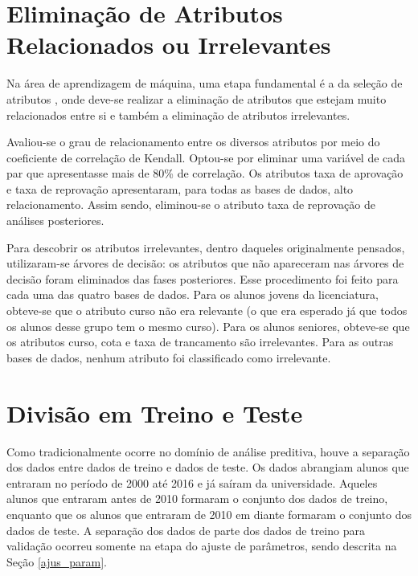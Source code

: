 \section{Eliminação de Atributos Relacionados ou Irrelevantes}
\par Na área de aprendizagem de máquina, uma etapa fundamental é a da seleção de
atributos \cite{useful_ml}, onde deve-se realizar a
eliminação de atributos que estejam muito relacionados entre si e também a eliminação
de atributos irrelevantes. 
 
\par Avaliou-se o grau de relacionamento entre os diversos atributos por meio do
coeficiente de correlação de Kendall. Optou-se por eliminar uma variável de cada par
que apresentasse mais de 80\% de correlação. Os atributos taxa de aprovação e taxa de
reprovação apresentaram, para todas as bases de dados, alto relacionamento. Assim
sendo, eliminou-se o atributo taxa de reprovação de análises posteriores. 

\par Para descobrir os atributos irrelevantes, dentro daqueles originalmente
pensados, utilizaram-se árvores de decisão: os atributos que não apareceram nas
árvores de decisão foram eliminados das fases posteriores. Esse procedimento foi
feito para cada uma das quatro bases de dados. Para os alunos jovens da licenciatura,
obteve-se que o atributo curso não era relevante (o que era esperado já que todos os alunos
desse grupo tem o mesmo curso). Para os alunos seniores, obteve-se que os atributos
curso, cota e taxa de trancamento são irrelevantes. Para as outras bases de dados, nenhum
atributo foi classificado como irrelevante. 

\section{Divisão em Treino e Teste}
Como tradicionalmente ocorre no domínio de análise preditiva, houve a separação dos
dados entre dados de treino e dados de teste. Os dados abrangiam alunos que entraram
no período de 2000 até 2016 e já saíram da universidade. Aqueles alunos que entraram
antes de 2010 formaram o conjunto dos dados de treino, enquanto que os alunos que
entraram de 2010 em diante formaram o conjunto dos dados de teste. A separação dos
dados de parte dos dados de treino para validação ocorreu somente na etapa do ajuste
de parâmetros, sendo descrita na Seção \ref{ajus_param}.

